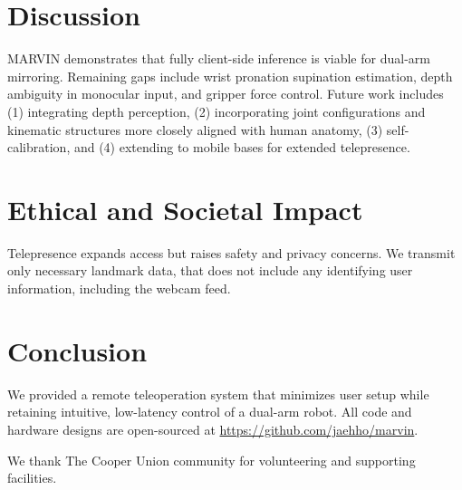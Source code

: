 \documentclass[acmsmall, screen]{acmart}
\begin{document}
\section{Discussion}
MARVIN demonstrates that fully client-side inference is viable for dual-arm mirroring. Remaining gaps include wrist pronation supination estimation, depth ambiguity in monocular input, and gripper force control. Future work includes (1) integrating depth perception, (2) incorporating joint configurations and kinematic structures more closely aligned with human anatomy, (3) self-calibration, and (4) extending to mobile bases for extended telepresence.

\section{Ethical and Societal Impact}
Telepresence expands access but raises safety and privacy concerns. We transmit only necessary landmark data, that does not include any identifying user information, including the webcam feed.

\section{Conclusion}
We provided a remote teleoperation system that minimizes user setup while retaining intuitive, low-latency control of a dual-arm robot. All code and hardware designs are open-sourced at \url{https://github.com/jaehho/marvin}.

\begin{acks}
We thank The Cooper Union community for volunteering and supporting facilities.
\end{acks}



\end{document}
